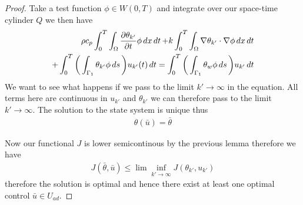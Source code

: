 \begin{proof}
Take a test function $\phi \in W(0,T)$ and integrate over our space-time cylinder $Q$ we then have 
\begin{align*}
    \rho c_p \int_0^T\int_{\Omega}\frac{\partial \theta_{k'}}{\partial t}\phi \mathop{dx}\mathop{dt} + k \int_0^T \int_{\Omega}\nabla \theta_{k'} \cdot \nabla \phi \mathop{dx}\mathop{dt} \\ + \int_0^T \bigg (\int_{\Gamma_1}\theta_{k'}\phi \mathop{ds} \bigg )u_{k'}(t) \mathop{dt} =
    \int_0^T \bigg (\int_{\Gamma_1}\theta_w\phi \mathop{ds} \bigg ) u_{k'} \mathop{dt} 
\end{align*}
We want to see what happens if we pass to the limit $k' \rightarrow \infty$ in the equation. All terms here are continuous in $u_{k'}$ and $\theta_{k'}$ we can therefore pass to the limit $k' \rightarrow \infty$. The solution to the state system is unique thus 
\begin{align*}
    \theta(\bar{u}) = \bar{\theta} 
\end{align*}

Now our functional $J$ is lower semicontinous by the previous lemma therefore we have  
\begin{align*}
    J(\bar{\theta}, \bar{u}) \leq \lim \inf_{k'\rightarrow \infty} J(\theta_{k'}, u_{k'})
\end{align*}
therefore the solution is optimal and hence there exist at least one optimal control $\bar{u} \in U_{ad}$. 
\end{proof}